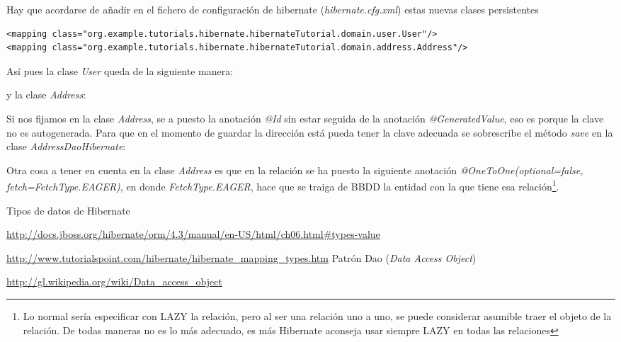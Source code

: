 \documentclass{article}
\begin{document}
	Hay que acordarse de añadir en el fichero de configuración de hibernate (\emph{hibernate.cfg.xml}) estas nuevas clases persistentes
\begin{lstlisting}[style=xml]
<mapping class="org.example.tutorials.hibernate.hibernateTutorial.domain.user.User"/>
<mapping class="org.example.tutorials.hibernate.hibernateTutorial.domain.address.Address"/>
\end{lstlisting}

	Así pues la clase \emph{User} queda de la siguiente manera:


	y la clase \emph{Address}:


Si nos fijamos en la clase \emph{Address}, se a puesto la anotación \emph{@Id} sin estar seguida de la anotación \emph{@GeneratedValue}, eso es porque la clave no es autogenerada. Para que en el momento de guardar la dirección está pueda tener la clave adecuada se sobrescribe el método \emph{save} en la clase \emph{AddressDaoHibernate}:


Otra cosa a tener en cuenta en la clase \emph{Address} es que en la relación se ha puesto la siguiente anotación \emph{@OneToOne(optional=false, fetch=FetchType.EAGER)}, en donde \emph{FetchType.EAGER}, hace que se traiga de BBDD la entidad con la que tiene esa relación\footnote{ {\color{red} Lo normal sería especificar con LAZY la relación, pero al ser una relación uno a uno, se puede considerar asumible traer el objeto de la relación. De todas maneras no es lo más adecuado, es más Hibernate aconseja usar siempre LAZY en todas las relaciones} }.

\clearpage
\newpage
{\setlength{\parskip}{0mm}\listoffigures}

\clearpage

\renewcommand{\bibname}{Referencias}
\begin{thebibliography}{99}
Tipos de datos de Hibernate

\url{http://docs.jboss.org/hibernate/orm/4.3/manual/en-US/html/ch06.html\#types-value}

\url{http://www.tutorialspoint.com/hibernate/hibernate\_mapping\_types.htm}
Patrón Dao (\textit{Data Access Object})

\url{http://gl.wikipedia.org/wiki/Data_access_object}
\end{thebibliography}
\end{document}
